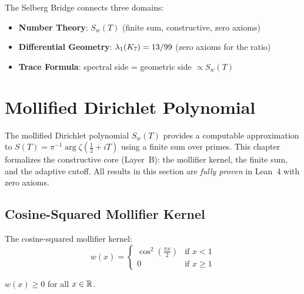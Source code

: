 \begin{remark}
    The Selberg Bridge connects three domains:
    \begin{itemize}
        \item \textbf{Number Theory}: $S_w(T)$ (finite sum, constructive, zero axioms)
        \item \textbf{Differential Geometry}: $\lambda_1(K_7) = 13/99$ (zero axioms for the ratio)
        \item \textbf{Trace Formula}: spectral side = geometric side $\propto S_w(T)$
    \end{itemize}
\end{remark}

\chapter{Mollified Dirichlet Polynomial}\label{chap:mollified_sum}

The mollified Dirichlet polynomial $S_w(T)$ provides a computable approximation
to $S(T) = \pi^{-1}\arg\zeta(\frac{1}{2} + iT)$ using a finite sum over primes.
This chapter formalizes the constructive core (Layer~B): the mollifier kernel,
the finite sum, and the adaptive cutoff. All results in this section are
\emph{fully proven} in Lean~4 with zero axioms.

\section{Cosine-Squared Mollifier Kernel}

\begin{definition}\label{def:cosineKernel}
    \leanok
    The cosine-squared mollifier kernel:
    \[
        w(x) = \begin{cases}
            \cos^2\!\left(\frac{\pi x}{2}\right) & \text{if } x < 1 \\
            0 & \text{if } x \geq 1
        \end{cases}
    \]
\end{definition}

\begin{theorem}\label{thm:kernel_nonneg}
    \leanok
    $w(x) \geq 0$ for all $x \in \mathbb{R}$.
\end{theorem}

